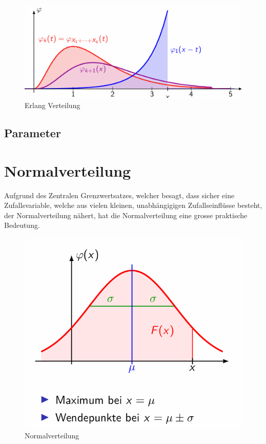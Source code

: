 \documentclass[../Main.tex]{subfiles}
\begin{document}
\begin{figure}[H]
    \centering
    \includegraphics[width=0.75\linewidth]{Images/erlang.png}
    \caption{Erlang Verteilung}
\end{figure}

\subsection{Parameter}

\section{Normalverteilung}
Aufgrund des Zentralen Grenzwertsatzes, welcher besagt,
dass sicher eine Zufallsvariable, welche aus vielen kleinen,
unabhängigigen Zufallseinflüsse besteht, der Normalverteilung
nähert, hat die Normalverteilung eine grosse praktische Bedeutung.


\begin{figure}[H]
    \centering
    \includegraphics[width=0.5\linewidth]{Images/normalverteilung.png}
    \caption{Normalverteilung}
\end{figure}

\end{document}
